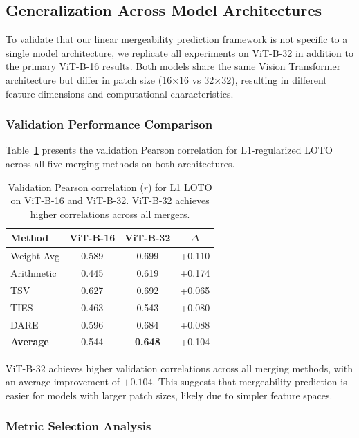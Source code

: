 \subsection{Generalization Across Model Architectures}
\label{sec:architecture_generalization}

To validate that our linear mergeability prediction framework is not specific to a single model architecture, we replicate all experiments on ViT-B-32 in addition to the primary ViT-B-16 results. Both models share the same Vision Transformer architecture but differ in patch size (16$\times$16 vs 32$\times$32), resulting in different feature dimensions and computational characteristics.

\subsubsection{Validation Performance Comparison}

Table~\ref{tab:arch_comparison} presents the validation Pearson correlation for L1-regularized LOTO across all five merging methods on both architectures.

\begin{table}[h]
\centering
\caption{Validation Pearson correlation ($r$) for L1 LOTO on ViT-B-16 and ViT-B-32. ViT-B-32 achieves higher correlations across all mergers.}
\label{tab:arch_comparison}
\begin{tabular}{l|cc|c}
\toprule
\textbf{Method} & \textbf{ViT-B-16} & \textbf{ViT-B-32} & \textbf{$\Delta$} \\
\midrule
Weight Avg & 0.589 & 0.699 & +0.110 \\
Arithmetic & 0.445 & 0.619 & +0.174 \\
TSV & 0.627 & 0.692 & +0.065 \\
TIES & 0.463 & 0.543 & +0.080 \\
DARE & 0.596 & 0.684 & +0.088 \\
\midrule
\textbf{Average} & 0.544 & \textbf{0.648} & +0.104 \\
\bottomrule
\end{tabular}
\end{table}

ViT-B-32 achieves higher validation correlations across all merging methods, with an average improvement of $+0.104$. This suggests that mergeability prediction is easier for models with larger patch sizes, likely due to simpler feature spaces.

\subsubsection{Metric Selection Analysis}


